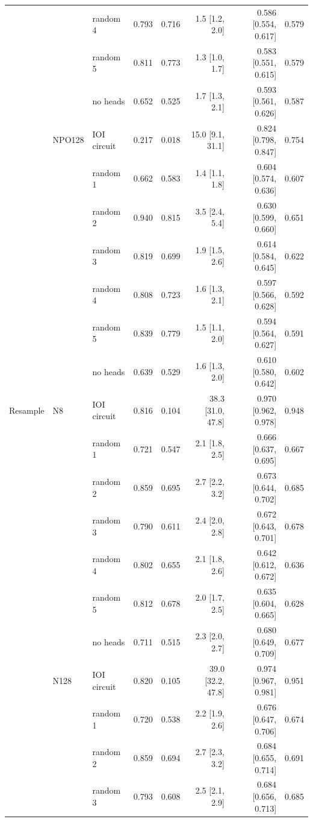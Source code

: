 \begin{tabular}{@{}lllrrrrr@{}}
 &  & random 4 & 0.793 & 0.716 & 1.5 [1.2, 2.0] & 0.586 [0.554, 0.617] & 0.579 \\
 &  & random 5 & 0.811 & 0.773 & 1.3 [1.0, 1.7] & 0.583 [0.551, 0.615] & 0.579 \\
 &  & no heads & 0.652 & 0.525 & 1.7 [1.3, 2.1] & 0.593 [0.561, 0.626] & 0.587 \\
\addlinespace[2pt]
 & NPO128 & IOI circuit & 0.217 & 0.018 & 15.0 [9.1, 31.1] & 0.824 [0.798, 0.847] & 0.754 \\
 &  & random 1 & 0.662 & 0.583 & 1.4 [1.1, 1.8] & 0.604 [0.574, 0.636] & 0.607 \\
 &  & random 2 & 0.940 & 0.815 & 3.5 [2.4, 5.4] & 0.630 [0.599, 0.660] & 0.651 \\
 &  & random 3 & 0.819 & 0.699 & 1.9 [1.5, 2.6] & 0.614 [0.584, 0.645] & 0.622 \\
 &  & random 4 & 0.808 & 0.723 & 1.6 [1.3, 2.1] & 0.597 [0.566, 0.628] & 0.592 \\
 &  & random 5 & 0.839 & 0.779 & 1.5 [1.1, 2.0] & 0.594 [0.564, 0.627] & 0.591 \\
 &  & no heads & 0.639 & 0.529 & 1.6 [1.3, 2.0] & 0.610 [0.580, 0.642] & 0.602 \\
\midrule
Resample & N8 & IOI circuit & 0.816 & 0.104 & 38.3 [31.0, 47.8] & 0.970 [0.962, 0.978] & 0.948 \\
 &  & random 1 & 0.721 & 0.547 & 2.1 [1.8, 2.5] & 0.666 [0.637, 0.695] & 0.667 \\
 &  & random 2 & 0.859 & 0.695 & 2.7 [2.2, 3.2] & 0.673 [0.644, 0.702] & 0.685 \\
 &  & random 3 & 0.790 & 0.611 & 2.4 [2.0, 2.8] & 0.672 [0.643, 0.701] & 0.678 \\
 &  & random 4 & 0.802 & 0.655 & 2.1 [1.8, 2.6] & 0.642 [0.612, 0.672] & 0.636 \\
 &  & random 5 & 0.812 & 0.678 & 2.0 [1.7, 2.5] & 0.635 [0.604, 0.665] & 0.628 \\
 &  & no heads & 0.711 & 0.515 & 2.3 [2.0, 2.7] & 0.680 [0.649, 0.709] & 0.677 \\
\addlinespace[2pt]
 & N128 & IOI circuit & 0.820 & 0.105 & 39.0 [32.2, 47.8] & 0.974 [0.967, 0.981] & 0.951 \\
 &  & random 1 & 0.720 & 0.538 & 2.2 [1.9, 2.6] & 0.676 [0.647, 0.706] & 0.674 \\
 &  & random 2 & 0.859 & 0.694 & 2.7 [2.3, 3.2] & 0.684 [0.655, 0.714] & 0.691 \\
 &  & random 3 & 0.793 & 0.608 & 2.5 [2.1, 2.9] & 0.684 [0.656, 0.713] & 0.685 \\

\end{tabular}
